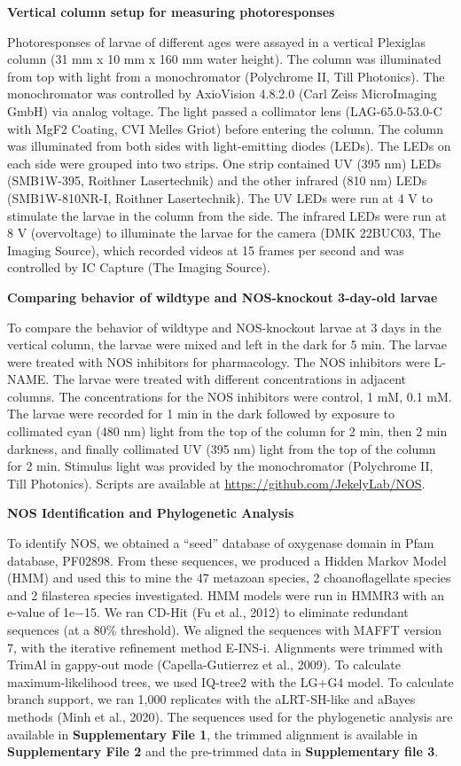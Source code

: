 \documentclass[
  10pt,
  onecolumn]{article}
\begin{document}
\textbf{Vertical column setup for measuring photoresponses}

Photoresponses of larvae of different ages were assayed in a vertical
Plexiglas column (31 mm x 10 mm x 160 mm water height). The column was
illuminated from top with light from a monochromator (Polychrome II,
Till Photonics). The monochromator was controlled by AxioVision 4.8.2.0
(Carl Zeiss MicroImaging GmbH) via analog voltage. The light passed a
collimator lens (LAG-65.0-53.0-C with MgF2 Coating, CVI Melles Griot)
before entering the column. The column was illuminated from both sides
with light-emitting diodes (LEDs). The LEDs on each side were grouped
into two strips. One strip contained UV (395 nm) LEDs (SMB1W-395,
Roithner Lasertechnik) and the other infrared (810 nm) LEDs
(SMB1W-810NR-I, Roithner Lasertechnik). The UV LEDs were run at 4 V to
stimulate the larvae in the column from the side. The infrared LEDs were
run at 8 V (overvoltage) to illuminate the larvae for the camera (DMK
22BUC03, The Imaging Source), which recorded videos at 15 frames per
second and was controlled by IC Capture (The Imaging Source).

\textbf{Comparing behavior of wildtype and NOS-knockout 3-day-old
larvae}

To compare the behavior of wildtype and NOS-knockout larvae at 3 days in
the vertical column, the larvae were mixed and left in the dark for 5
min. The larvae were treated with NOS inhibitors for pharmacology. The
NOS inhibitors were L-NAME. The larvae were treated with different
concentrations in adjacent columns. The concentrations for the NOS
inhibitors were control, 1 mM, 0.1 mM. The larvae were recorded for 1
min in the dark followed by exposure to collimated cyan (480 nm) light
from the top of the column for 2 min, then 2 min darkness, and finally
collimated UV (395 nm) light from the top of the column for 2 min.
Stimulus light was provided by the monochromator (Polychrome II, Till
Photonics). Scripts are available at
\url{https://github.com/JekelyLab/NOS}.

\textbf{NOS Identification and Phylogenetic Analysis}

To identify NOS, we obtained a ``seed'' database of oxygenase domain in
Pfam database, PF02898. From these sequences, we produced a Hidden
Markov Model (HMM) and used this to mine the 47 metazoan species, 2
choanoflagellate species and 2 filasterea species investigated. HMM
models were run in HMMR3 with an e-value of 1e−15. We ran CD-Hit (Fu et
al., 2012) to eliminate redundant sequences (at a 80\% threshold). We
aligned the sequences with MAFFT version 7, with the iterative
refinement method E-INS-i. Alignments were trimmed with TrimAl in
gappy-out mode (Capella-Gutierrez et al., 2009). To calculate
maximum-likelihood trees, we used IQ-tree2 with the LG+G4 model. To
calculate branch support, we ran 1,000 replicates with the aLRT-SH-like
and aBayes methods (Minh et al., 2020). The sequences used for the
phylogenetic analysis are available in \textbf{Supplementary File 1},
the trimmed alignment is available in \textbf{Supplementary File 2} and
the pre-trimmed data in \textbf{Supplementary file 3}.
\end{document}
